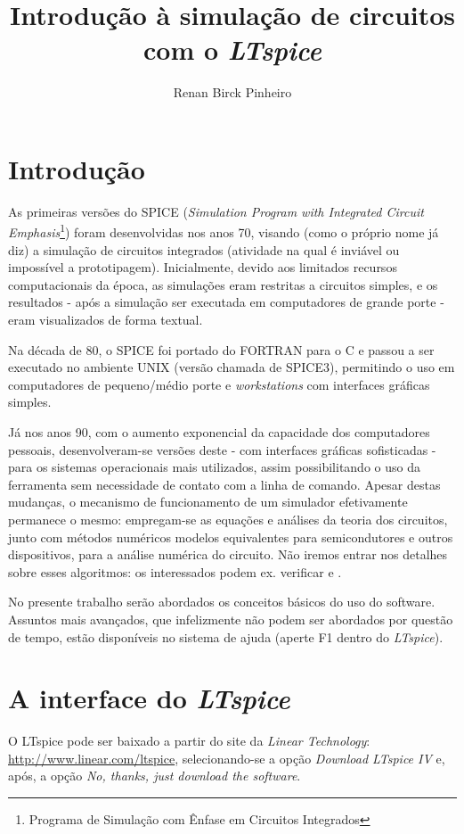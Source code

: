 \documentclass[]{book}
\title{\textbf{Introdução à simulação de circuitos com o \textit{LTspice}}}
\author{Renan Birck Pinheiro}
\begin{document}


\tableofcontents

\chapter{Introdução}
As primeiras versões do SPICE (\textit{Simulation Program with Integrated Circuit Emphasis}\footnote{Programa de Simulação com Ênfase em Circuitos Integrados}) foram desenvolvidas nos anos 70, visando (como o próprio nome já diz) a simulação de circuitos integrados (atividade na qual é inviável ou impossível a prototipagem). Inicialmente, devido aos limitados recursos computacionais da época, as simulações eram restritas a circuitos simples, e os resultados - após a simulação ser executada em computadores de grande porte - eram visualizados de forma textual.

Na década de 80, o SPICE foi portado do FORTRAN para o C e passou a ser executado no ambiente UNIX (versão chamada de SPICE3), permitindo o uso em computadores de pequeno/médio porte e \textit{workstations} com interfaces gráficas simples. 

Já nos anos 90, com o aumento exponencial da capacidade dos computadores pessoais, desenvolveram-se versões deste - com interfaces gráficas sofisticadas - para os sistemas operacionais mais utilizados, assim possibilitando o uso da ferramenta sem necessidade de contato com a linha de comando. Apesar destas mudanças, o mecanismo de funcionamento de um simulador  efetivamente permanece o mesmo: empregam-se as equações e análises da teoria dos circuitos, junto com métodos numéricos modelos equivalentes para semicondutores e outros dispositivos, para a análise numérica do circuito. Não iremos entrar nos detalhes sobre esses algoritmos: os interessados podem ex. verificar \cite{nagel} e \cite{chung}.

No presente trabalho serão abordados os conceitos básicos do uso do software. Assuntos mais avançados, que infelizmente não podem ser abordados por questão de tempo, estão disponíveis no sistema de ajuda (aperte F1 dentro do \textit{LTspice}).
\chapter{A interface do \textit{LTspice}}
O LTspice pode ser baixado a partir do site da \textit{Linear Technology}: \url{http://www.linear.com/ltspice}, selecionando-se a opção \textit{Download LTspice IV} e, após, a opção \textit{No, thanks, just download the software}. 
\end{document}
